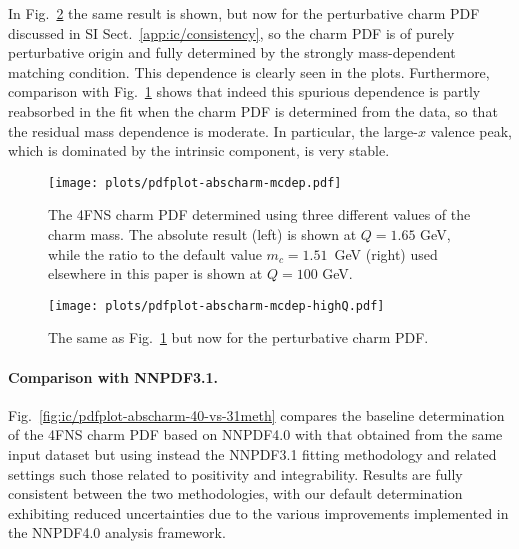 In Fig.~\ref{fig:ic/charm_pert_mcdep} the same result is shown, but now
for the perturbative charm PDF discussed in
SI Sect.~\ref{app:ic/consistency},  so the charm PDF is of
purely perturbative origin and fully determined by the strongly
mass-dependent matching condition. This dependence is clearly seen in
the plots. Furthermore, comparison with
Fig.~\ref{fig:ic/charm_fitted_mcdep} shows that indeed this spurious
dependence is partly reabsorbed in the fit when the charm PDF is
determined from the data, so that  the residual mass dependence is moderate.
In particular, the large-$x$ valence peak, which is dominated by the
intrinsic component, is very stable.

\begin{figure}[t]
  \begin{center}
    \texttt{[image: plots/pdfplot-abscharm-mcdep.pdf]}
    \caption{\small The 4FNS charm PDF determined
    using three different values of the charm mass. The absolute
    result (left) is shown at $Q=1.65$ GeV, while the ratio to the 
       default value
       $m_c=1.51$~GeV (right) used elsewhere in this paper is shown at $Q=100$ GeV.
   \label{fig:ic/charm_fitted_mcdep} }
\end{center}
\end{figure}

\begin{figure}[t]
  \begin{center}
    \texttt{[image: plots/pdfplot-abscharm-mcdep-highQ.pdf]}
    \caption{\small The same as Fig.~\ref{fig:ic/charm_fitted_mcdep} but now
    for the perturbative charm PDF.
  \label{fig:ic/charm_pert_mcdep} }
\end{center}
\end{figure}



  \paragraph{Comparison with NNPDF3.1.}
  Fig.~\ref{fig:ic/pdfplot-abscharm-40-vs-31meth} compares
  the baseline determination of the 4FNS charm PDF based
  on NNPDF4.0 with that obtained
  from the same input dataset but using instead
  the NNPDF3.1 fitting methodology and related settings such those related to positivity
  and integrability.
  Results are fully consistent between the two methodologies, with our default
  determination exhibiting reduced uncertainties due to
  the various improvements implemented
  in the NNPDF4.0 analysis framework.
  
